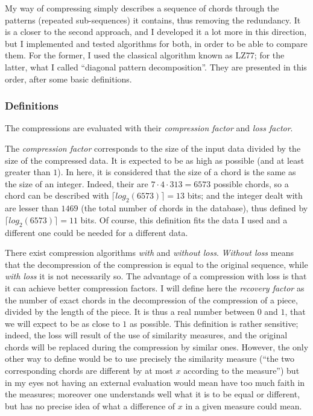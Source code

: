 \documentclass[a4paper,10pt]{article}
\newcommand{\guill}[1]{``#1''}
\begin{document}
My way of compressing simply describes a sequence of chords through the patterns (repeated sub-sequences) it contains, thus removing the redundancy. It is a closer to the second approach, and I developed it a lot more in this direction, but I implemented and tested algorithms for both, in order to be able to compare them. For the former, I used the classical algorithm known as LZ77; for the latter, what I called \guill{diagonal pattern decomposition}. They are presented in this order, after some basic definitions.


\subsubsection{Definitions}

The compressions are evaluated with their \emph{compression factor} and \emph{loss factor}.

The \emph{compression factor} corresponds to the size of the input data divided by the size of the compressed data. It is expected to be as high as possible (and at least greater than $1$). In here, it is considered that the size of a chord is the same as the size of an integer. Indeed, their are $7\cdot4\cdot313=6573$ possible chords, so a chord can be described with $\lceil log_2(6573)\rceil = 13$ bits; and the integer dealt with are lesser than $1469$ (the total number of chords in the database), thus defined by $\lceil log_2(6573)\rceil = 11$ bits. Of course, this definition fits the data I used and a different one could be needed for a different data.

There exist compression algorithms \emph{with} and \emph{without loss}. \emph{Without loss} means that the decompression of the compression is equal to the original sequence, while \emph{with loss} it is not necessarily so. The advantage of a compression with loss is that it can achieve better compression factors. I will define here the \emph{recovery factor} as the number of exact chords in the decompression of the compression of a piece, divided by the length of the piece. It is thus a real number between $0$ and $1$, that we will expect to be as close to $1$ as possible. This definition is rather sensitive; indeed, the loss will result of the use of similarity measures, and the original chords will be replaced during the compression by similar ones. However, the only other way to define would be to use precisely the similarity measure (\guill{the two corresponding chords are different by at most $x$ according to the measure}) but in my eyes not having an external evaluation would mean have too much faith in the measures; moreover one understands well what it is to be equal or different, but has no precise idea of what a difference of $x$ in a given measure could mean.
\end{document}
